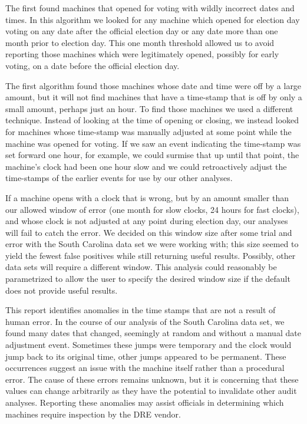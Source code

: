 The first found machines that opened for voting with wildly incorrect
dates and times. In this algorithm we looked for any machine which
opened for election day voting on any date after the official election
day or any date more than one month prior to election day. This one
month threshold allowed us to avoid reporting those machines which
were legitimately opened, possibly for early voting, on a date before
the official election day. 

The first algorithm found those machines whose date and time were
off by a large amount, but it will not find machines that have a
time-stamp that is off by only a small amount, perhaps just an
hour. To find those machines we used a different technique. Instead of
looking at the time of opening or closing, we instead looked for
machines whose time-stamp was manually adjusted at some point while
the machine was opened for voting. If we saw an event indicating the
time-stamp was set forward one hour, for example, we could surmise that
up until that point, the machine's clock had been one hour slow and we
could retroactively adjust the time-stamps of the earlier events for
use by our other analyses.

If a machine opens with a clock that is wrong, but by an amount
smaller than our allowed window of error (one month for slow clocks,
24 hours for fast clocks), and whose clock is not adjusted at any
point during election day, our analyses will fail to catch the
error. We decided on this window size after some trial and error with
the South Carolina data set we were working with; this size seemed to
yield the fewest false positives while still returning useful
results. Possibly, other data sets will require a different
window. This analysis could reasonably be parametrized to
allow the user to specify the desired window size if the default does
not provide useful results.

This report identifies anomalies in the time stamps that are not a result
of human error. In the course of our analysis of the South Carolina
data set, we found many dates that changed, seemingly at random and without
a manual date adjustment event. Sometimes these jumps were temporary
and the clock would jump back to its original time, other jumps
appeared to be permanent. These occurrences suggest an issue with the
machine itself rather than a procedural error. The cause of these errors remains
unknown, but it is concerning that these values can change arbitrarily
as they have the potential to invalidate other audit analyses.  Reporting these
anomalies may assist officials in determining which machines require
inspection by the DRE vendor.

